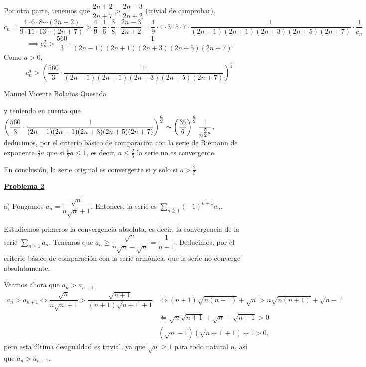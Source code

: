 \documentclass[10pt,a4paper]{article}
\begin{document}
	Por otra parte, tenemos que $\dfrac{2n+2}{2n+7} > \dfrac{2n-3}{2n+2}$ (trivial de comprobar).
	$$c_n = \dfrac{4 \cdot 6 \cdot 8 \cdots (2n+2)}{9 \cdot 11 \cdot 13 \cdots (2n+7)} > \dfrac{4}{9} \cdot \dfrac{1}{6} \cdot \dfrac{3}{8} \cdots \dfrac{2n-3}{2n+2} = \dfrac{4 }{9} \cdot 4 \cdot 3 \cdot 5 \cdot 7 \cdot \dfrac{1}{(2n-1)(2n+1)(2n+3)(2n+5)(2n+7)} \cdot \dfrac{1}{c_n}$$ 
	$$ \implies c_n^2 > \dfrac{560}{3} \cdot \dfrac{1}{(2n-1)(2n+1)(2n+3)(2n+5)(2n+7)}$$
	Como $a > 0$,
	$$c_n^a > \left(\dfrac{560}{3} \cdot \dfrac{1}{(2n-1)(2n+1)(2n+3)(2n+5)(2n+7)}\right) ^{\tfrac{a}{2}}$$
	
	Manuel Vicente Bolaños Quesada \newline
	
	y teniendo en cuenta que $\left(\dfrac{560}{3} \cdot \dfrac{1}{(2n-1)(2n+1)(2n+3)(2n+5)(2n+7)}\right) ^{\tfrac{a}{2}} \thicksim \left(\dfrac{35}{6}\right) ^{\tfrac{a}{2}} \dfrac{1}{n^{\tfrac{5}{2}a}}$, \\
	 deducimos, por el criterio básico de comparación con la serie de Riemann de exponente $\frac{5}{2} a$ que si $\frac{5}{2} a \leq 1$, es decir, $a \leq \frac{2}{5}$ la serie no es convergente.
	 
	 En conclusión, la serie original es convergente si y solo si $a > \frac{2}{5}$ \newline	
	
	\begin{flushleft}
		\textbf{\underline{Problema 2}}
	\end{flushleft}
	
	a) Pongamos $a_n = \dfrac{\sqrt{n}}{n \sqrt{n} + 1}$. Entonces, la serie es $\displaystyle\sum_{n \geq 1} (-1) ^{n+1} a_n$. 
	
	Estudiemos primeros la convergencia absoluta, es decir, la convergencia de la serie $\displaystyle\sum_{n \geq 1} a_n$. Tenemos que $a_n \geq \dfrac{\sqrt{n}}{n\sqrt{n} + \sqrt{n}} = \dfrac{1}{n+1}$. Deducimos, por el criterio básico de comparación con la serie armónica, que la serie no converge absolutamente.
	
	Veamos ahora que $a_n > a_{n+1}$ 
	\begin{equation*}
		\begin{split}
			a_n > a_{n+1} \Leftrightarrow \dfrac{\sqrt{n}}{n\sqrt{n} + 1} > \dfrac{\sqrt{n+1}}{(n+1)\sqrt{n+1} + 1} & \Leftrightarrow (n+1)\sqrt{n(n+1)} + \sqrt{n} > n \sqrt{n(n+1)} + \sqrt{n+1} \\
			& \Leftrightarrow \sqrt{n} \sqrt{n+1} + \sqrt{n} - \sqrt{n+1} > 0 \\
			& (\sqrt{n} - 1)(\sqrt{n+1} + 1) + 1 > 0,
		\end{split}
	\end{equation*}
	pero esta última desigualdad es trivial, ya que $\sqrt{n} \geq 1$ para todo natural $n$, así que $a_n > a_{n+1}$. \newline
	
\end{document}
